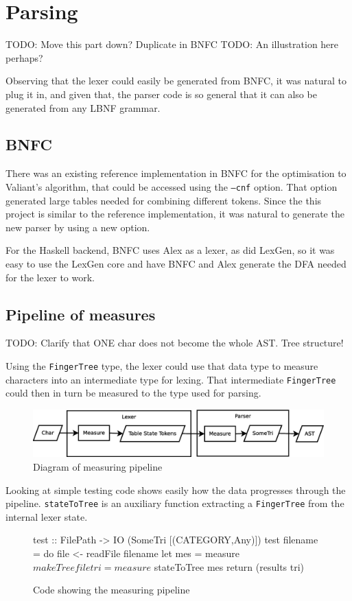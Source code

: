 \documentclass[a4paper,12pt,twosided]{report}
\begin{document}
\section{Parsing}
TODO: Move this part down? Duplicate in BNFC
TODO: An illustration here perhaps?

Observing that the lexer could easily be generated from BNFC, it was natural to
plug it in, and given that, the parser code is so general that it can also be
generated from any LBNF grammar.
\subsection{BNFC}
There was an existing reference implementation in BNFC for the optimisation to
Valiant's algorithm, that could be accessed using the \texttt{--cnf} option.
That option generated large tables needed for combining different tokens. Since
the this project is similar to the reference implementation, it was natural to
generate the new parser by using a new option.

For the Haskell backend, BNFC uses Alex as a lexer, as did LexGen, so it was
easy to use the LexGen core and have BNFC and Alex generate the DFA needed for
the lexer to work. 

\subsection{Pipeline of measures}
TODO: Clarify that ONE char does not become the whole AST. Tree structure!

Using the \texttt{FingerTree} type, the lexer could use that data type to
measure characters into an intermediate type for lexing. That intermediate
\texttt{FingerTree} could then in turn be measured to the type used for parsing.
\begin{figure}[H]
\includegraphics[width=\textwidth]{pipeline.eps}
\caption{Diagram of measuring pipeline}
\end{figure}
Looking at simple testing code shows easily how the data progresses through the
pipeline. \texttt{stateToTree} is an auxiliary function extracting a
\texttt{FingerTree} from the internal lexer state.

\begin{figure}[H]
\begin{code}
test :: FilePath -> IO (SomeTri [(CATEGORY,Any)])
test filename = do
    file <- readFile filename
    let mes = measure $ makeTree file
        tri = measure $ stateToTree mes
    return (results tri)
\end{code} 
\caption{Code showing the measuring pipeline}
\end{figure}
\end{document}
